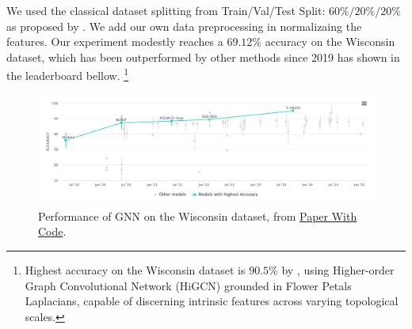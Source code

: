 \documentclass{article}
\theoremstyle{plain}
\theoremstyle{definition}
\theoremstyle{remark}
\begin{document}
We used the classical dataset splitting from Train/Val/Test Split: $60\%/20\%/20\%$ 
as proposed by \cite{attali2024delaunay}. We add our own data preprocessing in normalizaing the features.
Our experiment modestly reaches a $69.12\%$ accuracy on the Wisconsin dataset,
which has been outperformed by other methods since 2019 has shown in the leaderboard bellow.
\footnote{Highest accuracy on the Wisconsin dataset is $90.5\%$ by \cite{huang2024higherordergraphconvolutionalnetwork}, using
Higher-order Graph Convolutional Network (HiGCN) grounded in Flower Petals Laplacians, 
capable of discerning intrinsic features across varying topological scales. }

\begin{figure}[htb!]
    \includegraphics[width=\textwidth]{figures/Wisconsin_leaderboard.png}
    \caption{Performance of GNN on the Wisconsin dataset, from \href{https://paperswithcode.com/sota/node-classification-on-wisconsin}{Paper With Code}.}
    \label{fig:wisconsin_leaderboard}
\end{figure}

\end{document}
